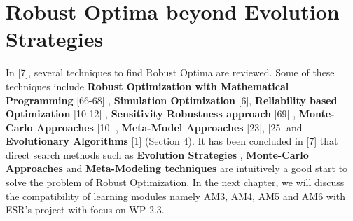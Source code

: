 \section {Robust Optima beyond Evolution Strategies}

In [7], several techniques to find Robust Optima are reviewed. Some of these techniques include \textbf{Robust Optimization with Mathematical Programming} [66-68] , \textbf{Simulation Optimization} [6], \textbf{Reliability based Optimization} [10-12] , \textbf{Sensitivity Robustness approach} [69]  , \textbf{Monte-Carlo Approaches} [10] , \textbf{Meta-Model Approaches} [23], [25] and \textbf{Evolutionary Algorithms} [1] (Section 4). It has been concluded in [7] that direct search methods such as \textbf{Evolution Strategies} , \textbf{Monte-Carlo Approaches} and \textbf{Meta-Modeling techniques} are intuitively a good start to solve the problem of Robust Optimization. In the next chapter, we will discuss the compatibility of learning modules namely AM3, AM4, AM5 and AM6 with ESR's project with focus on WP 2.3.  







